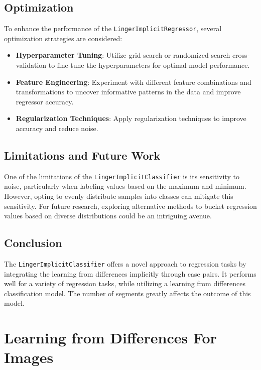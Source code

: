 \documentclass[a4paper, 12pt]{report}
\begin{document}
\subsection{Optimization}
To enhance the performance of the \texttt{LingerImplicitRegressor}, several optimization strategies are considered:
\begin{itemize}
    \item \textbf{Hyperparameter Tuning}: Utilize grid search or randomized search cross-validation to fine-tune the hyperparameters for optimal model performance.
    
    \item \textbf{Feature Engineering}: Experiment with different feature combinations and transformations to uncover informative patterns in the data and improve regressor accuracy.
    
    \item \textbf{Regularization Techniques}: Apply regularization techniques to improve accuracy and reduce noise.
\end{itemize}

\subsection{Limitations and Future Work}
One of the limitations of the \texttt{LingerImplicitClassifier} is its sensitivity to noise, particularly when labeling values based on the maximum and minimum. 
However, opting to evenly distribute samples into classes can mitigate this sensitivity. 
For future research, exploring alternative methods to bucket regression values based on diverse distributions could be an intriguing avenue.

\subsection{Conclusion}
The \texttt{LingerImplicitClassifier} offers a novel approach to regression tasks by integrating the learning from differences implicitly through case pairs. 
It performs well for a variety of regression tasks, while utilizing a learning from differences classification model. The number of segments greatly affects the outcome of this model.

\section{Learning from Differences For Images}
\label{sec:lingerImage_models}
\end{document}
